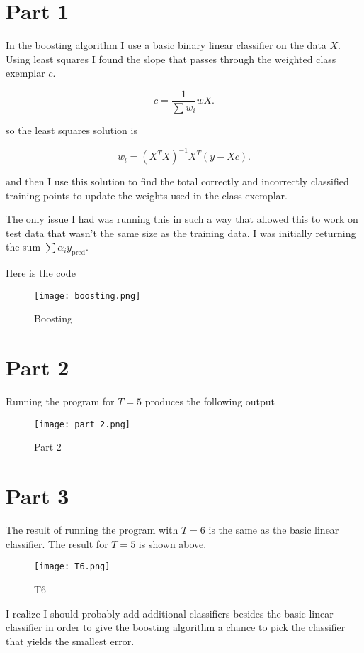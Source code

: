 
\subsectionfont{\fontsize{10}{10}\selectfont}

\graphicspath{{/home/computer/ucsc/master-2/quarter-1/machine-learning/assignment_04/figures/}}

\section{Part 1}%

In the boosting algorithm I use a basic binary linear classifier on the data
$X$. Using least squares I found the slope that passes through the weighted
class exemplar $c$. 

\[
c = \frac{1}{ \sum w_i} wX
.\] 

so the least squares solution is

\[
  w_l = (X^TX)^{-1}X^{T}(y-Xc)
.\] 

and then I use this solution to find the total correctly and incorrectly
classified training points to update the weights used in the class exemplar.


The only issue I had was running this in such a way that allowed this to work
on test data that wasn't the same size as the training data. I was initially
returning the sum $ \sum \alpha_i y_{\text{pred}}$.

Here is the code

\begin{figure}[H]
  \centering
  \texttt{[image: boosting.png]}
  \caption{Boosting}%
  \label{fig:boosting}
\end{figure}

\section{Part 2}%

Running the program for $T=5$ produces the following output

 \begin{figure}[H]
  \centering
  \texttt{[image: part\_2.png]}
  \caption{Part 2}%
  \label{fig:part2}
\end{figure}

\section{Part 3}%

The result of running the program with $T=6$ is the same as the basic linear
classifier. The result for $T=5$ is shown above.

\begin{figure}[H]
  \centering
  \texttt{[image: T6.png]}
  \caption{T6}%
  \label{fig:T6}
\end{figure}

I realize I should probably add additional classifiers besides the basic linear
classifier in order to give the boosting algorithm a chance to pick the
classifier that yields the smallest error.
